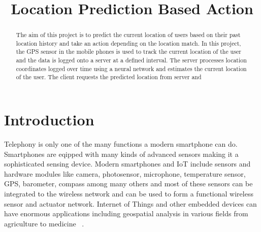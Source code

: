 \documentclass[conference]{IEEEtran}
\begin{document}
%
\title{Location Prediction Based Action}


\author{
}

\maketitle


\begin{abstract}
The aim of this project is to  predict the current location of users based on their past location history and take an action depending on the location match. In this project, the GPS sensor in the mobile phones is used to track the current location of the user and the data is logged onto a server at a defined interval. The server processes location coordinates logged over time using a neural network and estimates the current location of the user. The client requests the predicted location from server and 
\end{abstract}

\IEEEpeerreviewmaketitle



\section{Introduction}
Telephony is only one of the many functions a modern smartphone can do. Smartphones are eqipped with many kinds of advanced sensors making it a sophisticated sensing device. Modern smartphones and IoT include sensors and hardware modules like camera, photosensor, microphone, temperature sensor, GPS, barometer, compass among many others and most of these sensors can be integrated to the wireless network and can be used to form a functional wireless sensor and actuator network. Internet of Things and other embedded devices can have enormous applications including geospatial analysis in various fields from agriculture to medicine ~\cite{iot1}.
\end{document}
